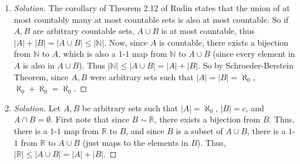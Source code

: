 \documentclass{article}
\newcommand{\N}{{\mathbb N}}
\newcommand{\R}{{\mathbb R}}
\begin{document}
\begin{enumerate}
\begin{proof}[Solution]
	Now to show the other direction, we will show there is a $1$-$1$ map, call it $\psi$,
	from $|A| + |B|$ to $\N$.
	We can enumerate each element in $A$ with $1,2,\dots,n$, so $A = \{a_1,a_2,\dots,a_n\}$.
	We give the bijection $\psi \colon A \cup B \to \N$ as follows
	\[
		\psi(x) =
		\begin{cases}
			n & x = a_n \in A\\
			\phi^{-1}(x) & x \in B
		\end{cases}
	\]
	Since the range of $n$ is $\{1,2,\dots,n\}$ and the range of $\phi^{-1} + n$ is $\{m \in \N \mid m > n\}$
	on their respective domains,
	and all the component functions are $1$-$1$
	(since $\phi^{-1}$ is an injective map onto $\N$, since $\phi$ is a bijection),
	no two elements are mapped to the same value in $\N$.
	Thus, $\psi$ is $1$-$1$, and so $|A| + |B| = |A \cup B| \leq |\N|$.
	Then by Schroeder-Bernstein Theorem, we have $|A| + |B| = |\N|$,
	and since $A,B$ were arbitrary given their cardinality,
	we have in general $n + \aleph_0 = \aleph_0$.
\end{proof}
\item \begin{proof}[Solution]\let\qed\relax
	The corollary of Theorem 2.12 of Rudin states that the union of at most countably many at most countable sets
	is also at most countable.
	So if $A,B$ are arbitrary countable sets,
	$A \cup B$ is at most countable, thus
	$|A| + |B| = |A \cup B| \leq |\N|$.
	Now, since $A$ is countable, there exists a bijection from $\N$ to $A$,
	which is also a $1$-$1$ map from $\N$ to $A \cup B$
	(since every element in $A$ is also in $A \cup B$).
	Thus $|\N| \leq |A \cup B| = |A| + |B|$.
	So by Schroeder-Berstein Theorem,
	since $A,B$ were arbitrary sets such that $|A|=|B| = \aleph_0$,
	$\aleph_0 + \aleph_0 = \aleph_0$.
\end{proof}
\item \begin{proof}[Solution]\let\qed\relax
	Let $A,B$ be arbitrary sets such that $|A|=\aleph_0$, $|B|=c$,
	and $A\cap B = \emptyset$.
	First note that since $B \sim \R$,
	there exists a bijection from $B$.
	Thus, there is a $1$-$1$ map from $\R$ to $B$,
	and since $B$ is a subset of $A \cup B$,
	there is a $1$-$1$ from $\R$ to $A \cup B$ (just maps to the elements in $B$).
	Thus, $|\R| \leq |A\cup B| = |A| + |B|$.


\end{proof}
\end{enumerate}
\end{document}
